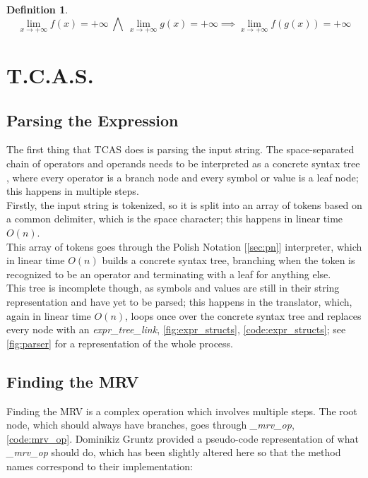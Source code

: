 \documentclass{article}
\theoremstyle{plain}
\theoremstyle{definition}
\newtheorem*{defn*}{Definition}
\theoremstyle{algorithm}
\begin{document}
	\begin{defn*}
		\[
		\lim_{x \to +\infty}{f(x)}=+\infty \: \bigwedge \: \lim_{x \to +\infty}{g(x)}=+\infty \implies \lim_{x \to +\infty}{f(g(x))}=+\infty
		\]
	\end{defn*}
	
	\section{T.C.A.S.}
	
	\subsection{Parsing the Expression}
	
	The first thing that TCAS does is parsing the input string. The space-separated chain of operators and operands needs to be interpreted as a concrete syntax tree \cite{wiki:parsetree}\cite{wiki:abtree}, where every operator is a branch node and every symbol or value is a leaf node; this happens in multiple steps.\\
	Firstly, the input string is tokenized, so it is split into an array of tokens based on a common delimiter, which is the space character; this happens in linear time \(O(n)\). \\
	This array of tokens goes through the Polish Notation [\ref{sec:pn}] interpreter, which in linear time \(O(n)\) builds a concrete syntax tree, branching when the token is recognized to be an operator and terminating with a leaf for anything else. \\
	This tree is incomplete though, as symbols and values are still in their string representation and have yet to be parsed; this happens in the translator, which, again in linear time \(O(n)\), loops once over the concrete syntax tree and replaces every node with an \textit{expr\_tree\_link}, \cref{fig:expr_structs}, \cref{code:expr_structs}; see \cref{fig:parser} for a representation of the whole process.
	
	\subsection{Finding the MRV}
	
	Finding the MRV is a complex operation which involves multiple steps. 
	The root node, which should always have branches, goes through \textit{\_mrv\_op}, \cref{code:mrv_op}. Dominikiz Gruntz provided a pseudo-code representation of what \textit{\_mrv\_op} should do, which has been slightly altered here so that the method names correspond to their implementation:
	
\end{document}
